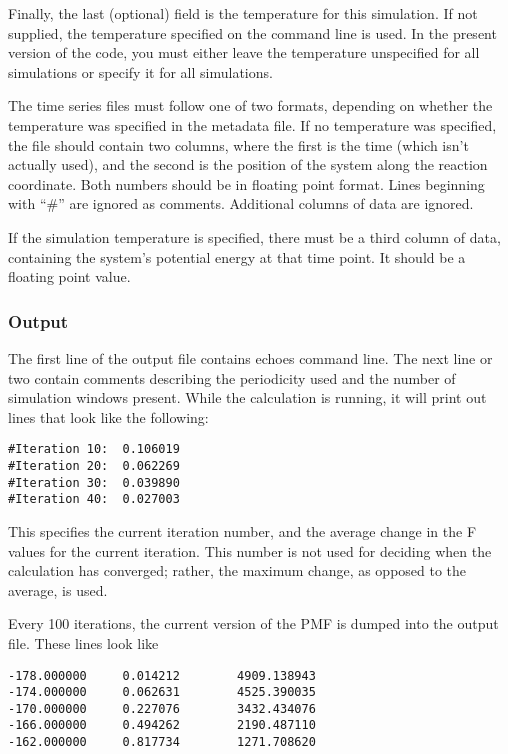 \documentclass[12pt]{article}
\begin{document}
Finally, the last (optional) field is the temperature for this simulation.  If
not supplied, the temperature specified on the command line is used.  In
the present version of the code, you must either leave the temperature
unspecified for all simulations or specify it for all simulations.  

The time series files must follow one of two formats, depending on whether
the temperature was specified in the metadata file.  If no temperature was
specified, the file should contain two columns, where the first is the time
(which isn't actually used), and the second is the position of the system
along the reaction coordinate.  Both numbers should be in floating point
format.  Lines beginning with ``\#'' are ignored as comments.  Additional
columns of data are ignored.

If the simulation temperature is specified, there must be a third column of
data, containing the system's potential energy at that time point.  It
should be a floating point value.

\subsubsection{Output}

The first line of the output file contains echoes command line.  The next
line or two contain comments describing the periodicity used and the number
of simulation windows present.  
While the calculation is running, it will print out lines that look like
the following:
\begin{verbatim}
#Iteration 10:  0.106019
#Iteration 20:  0.062269
#Iteration 30:  0.039890
#Iteration 40:  0.027003
\end{verbatim}

This specifies the current iteration number, and the average change in the
F values for the current iteration.  This number is not used for deciding
when the calculation has converged; rather, the maximum change, as opposed
to the average, is used.  

Every 100 iterations, the current version of the PMF is dumped into the
output file.  These lines look like

\begin{verbatim}
-178.000000     0.014212        4909.138943
-174.000000     0.062631        4525.390035
-170.000000     0.227076        3432.434076
-166.000000     0.494262        2190.487110
-162.000000     0.817734        1271.708620
\end{verbatim}
\end{document}
